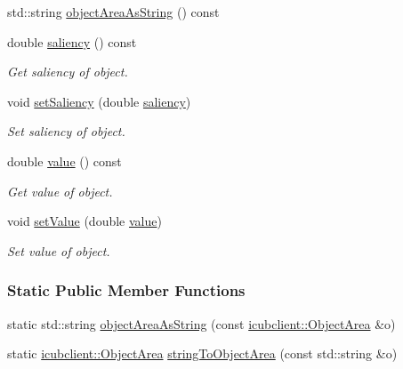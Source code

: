\begin{DoxyCompactItemize}
std\+::string \hyperlink{group__icubclient__representations_a1b656b2a08b880ca5905c3b2e675af19}{object\+Area\+As\+String} () const
\item 
double \hyperlink{group__icubclient__representations_a6b588211af9fae42e26d516f882986bd}{saliency} () const
\begin{DoxyCompactList}\small\item\em Get saliency of object. \end{DoxyCompactList}\item 
void \hyperlink{group__icubclient__representations_ae2d186d50a741b1d2c90ad5172268de8}{set\+Saliency} (double \hyperlink{group__icubclient__representations_a6b588211af9fae42e26d516f882986bd}{saliency})
\begin{DoxyCompactList}\small\item\em Set saliency of object. \end{DoxyCompactList}\item 
double \hyperlink{group__icubclient__representations_aa60275afeab2678509b4288d4c0a7a42}{value} () const
\begin{DoxyCompactList}\small\item\em Get value of object. \end{DoxyCompactList}\item 
void \hyperlink{group__icubclient__representations_a19d56c855f6cc48e8164eb1e9ecf4430}{set\+Value} (double \hyperlink{group__icubclient__representations_aa60275afeab2678509b4288d4c0a7a42}{value})
\begin{DoxyCompactList}\small\item\em Set value of object. \end{DoxyCompactList}\end{DoxyCompactItemize}
\subsubsection*{Static Public Member Functions}
\begin{DoxyCompactItemize}
\item 
static std\+::string \hyperlink{group__icubclient__representations_a2a9073877fc6ab21a1d6997930612c74}{object\+Area\+As\+String} (const \hyperlink{namespaceicubclient_a582031d3e105cc59d614d15d30d22e65}{icubclient\+::\+Object\+Area} \&o)
\item 
static \hyperlink{namespaceicubclient_a582031d3e105cc59d614d15d30d22e65}{icubclient\+::\+Object\+Area} \hyperlink{group__icubclient__representations_a36022118155dfd605b1208a246dce4c3}{string\+To\+Object\+Area} (const std\+::string \&o)
\end{DoxyCompactItemize}

